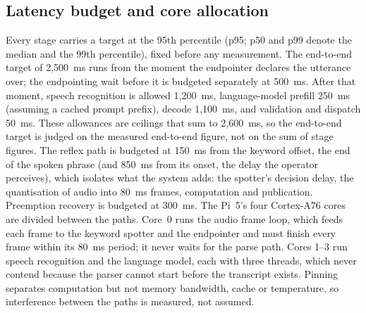\documentclass[a4paper,fleqn]{cas-dc}
\begin{document}
\paragraph{} 

\subsection{Latency budget and core allocation}
\label{sec:budget}

Every stage carries a target at the 95th percentile (p95; p50 and p99 denote the median and the 99th percentile), fixed before any measurement. The end-to-end target of 2,500~ms runs from the moment the endpointer declares the utterance over; the endpointing wait before it is budgeted separately at 500~ms. After that moment, speech recognition is allowed 1,200~ms, language-model prefill 250~ms (assuming a cached prompt prefix), decode 1,100~ms, and validation and dispatch 50~ms. These allowances are ceilings that sum to 2,600~ms, so the end-to-end target is judged on the measured end-to-end figure, not on the sum of stage figures. The reflex path is budgeted at 150~ms from the keyword offset, the end of the
spoken phrase (and 850~ms from its onset, the delay the operator perceives), which isolates what the system adds: the spotter's decision delay, the quantisation of
audio into 80~ms frames, computation and publication. Preemption recovery is budgeted at 300~ms.
The Pi~5's four Cortex-A76 cores are divided between the paths. Core~0 runs the audio frame loop,
which feeds each frame to the keyword spotter and the endpointer and must finish every frame within
its 80~ms period; it never waits for the parse path. Cores 1--3 run speech recognition and the
language model, each with three threads, which never contend because the parser cannot start
before the transcript exists. Pinning separates computation but not memory bandwidth, cache or
temperature, so interference between the paths is measured, not assumed.
\end{document}
